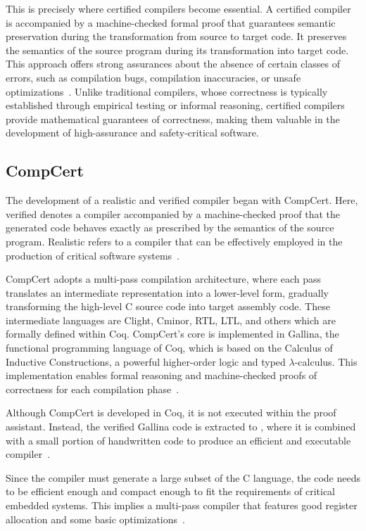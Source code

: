 This is precisely where certified compilers become essential. A certified compiler is accompanied by a machine-checked formal proof 
that guarantees semantic preservation during the transformation from source to target code. It preserves the semantics of the source 
program during its transformation into target code. This approach offers strong assurances about the absence of certain classes of 
errors, such as compilation bugs, compilation inaccuracies, or unsafe optimizations~\cite{Leroy09}. Unlike traditional compilers, 
whose correctness is typically established through empirical testing or informal reasoning, certified compilers provide mathematical 
guarantees of correctness, making them valuable in the development of high-assurance and safety-critical software.

\subsection{CompCert}
\label{sec:CompCert}

The development of a realistic and verified compiler began with CompCert. Here, verified denotes a compiler accompanied by
a machine-checked proof that the generated code behaves exactly as prescribed by the semantics of the source program.
Realistic refers to a compiler that can be effectively employed in the production of critical software systems~\cite{Leroy09-back-end}.

CompCert adopts a multi-pass compilation architecture, where each pass translates an intermediate representation into a lower-level 
form, gradually transforming the high-level C source code into target assembly code. These intermediate languages are Clight, Cminor, 
RTL, LTL, and others which are formally defined within Coq. CompCert's core is implemented in Gallina, the functional programming 
language of Coq, which is based on the Calculus of Inductive Constructions, a powerful higher-order logic and typed $\lambda$-calculus. 
This implementation enables formal reasoning and machine-checked proofs of correctness for each compilation phase~\cite{MonniauxB22}.

Although CompCert is developed in Coq, it is not executed within the proof assistant. Instead, the verified Gallina code is extracted 
to \ocaml, where it is combined with a small portion of handwritten \ocaml code to produce an efficient and executable 
compiler~\cite{MonniauxB22}.

Since the compiler must generate a large subset of the C language, the code needs to be eﬃcient enough and compact enough to fit the 
requirements of critical embedded systems. This implies a multi-pass compiler that features good register allocation and some basic 
optimizations~\cite{Leroy09-back-end}.

